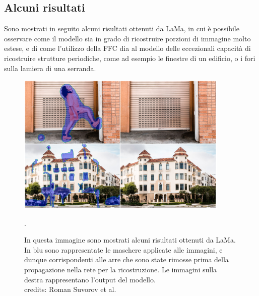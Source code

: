 \subsection{Alcuni risultati}
Sono mostrati in seguito alcuni risultati ottenuti da LaMa, in cui è possibile osservare come il modello sia in grado di ricostruire
porzioni di immagine molto estese, e di come l'utilizzo della FFC dia al modello delle eccezionali capacità di ricostruire 
strutture periodiche, come ad esempio le finestre di un edificio, o i fori sulla lamiera di una serranda.
    \begin{figure}[H]
        \centering
        \includegraphics[width=0.9\textwidth]{imgs/lama_results.png}
        \caption{In questa immagine sono mostrati alcuni risultati ottenuti da LaMa. In blu sono 
            rappresentate le maschere applicate alle immagini, e dunque corrispondenti alle arre che sono state rimosse prima
            della propagazione nella rete per la ricostruzione. Le immagini sulla destra rappresentano l'output del modello.\\
            credits: Roman Suvorov et al. \cite{suvorov2021resolutionrobust}}.
        \label{fig:lama_results}
    \end{figure}




